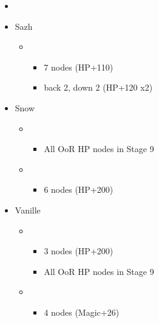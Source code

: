 \begin{menu}
	\begin{itemize}
	\paradigm
		\begin{itemize}
			\item {}%
				{\paradigmline{(\rav)}{\sen}{(\rav)}}%
				{\paradigmline{\com}{\com}{\sab}}%
				{\paradigmline{\syn)}{\sen}{(\med)}}%
				{\paradigmline{\rav}{(\sen)}{(\med)}}%
				{\paradigmline[4]{\sab}{\sen}{\sab}}%
				{\paradigmline{\rav}{\sen}{\rav}}%
		\end{itemize}
	\crystarium
		\begin{itemize}
			\item Sazh
				\begin{itemize}
					\item \com
						\begin{itemize}
							\item 7 nodes (HP+110)
							\item back 2, down 2 (HP+120 x2)
						\end{itemize}
				\end{itemize}
			\item Snow
				\begin{itemize}
					\item \rav
						\begin{itemize}
							\item All OoR HP nodes in Stage 9
						\end{itemize}
					\item \com
						\begin{itemize}
							\item 6 nodes (HP+200)
						\end{itemize}
				\end{itemize}
			\item Vanille
				\begin{itemize}
					\item \sab
						\begin{itemize}
							\item 3 nodes (HP+200)
							\item All OoR HP nodes in Stage 9
						\end{itemize}
					\item \rav
						\begin{itemize}
							\item 4 nodes (Magic+26)
						\end{itemize}
				\end{itemize}								

\end{itemize}
\end{itemize}
\end{menu}
